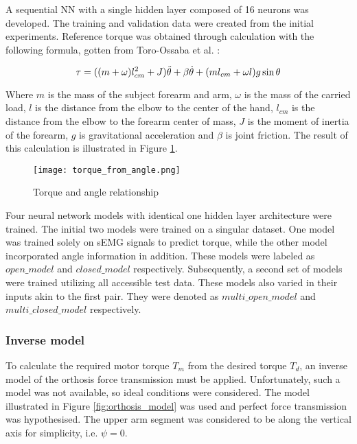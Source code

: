 A sequential NN with a single hidden layer composed of 16 neurons was developed. 
The training and validation data were created from the initial experiments. 
Reference torque was obtained through calculation with the following formula, 
gotten from Toro-Ossaba et al. \cite{toro-ossaba_myoelectric_2024}: 

\begin{equation}
  \centering
  \tau=((m+\omega)l_{cm}^2+J)\ddot{\theta}+\beta \dot{\theta}+(ml_{cm}+\omega l)g\sin{\theta}
  \label{eq:torque}
\end{equation}

Where $m$ is the mass of the subject forearm and arm, $\omega$ is the mass of 
the carried load, $l$ is the distance from the elbow to the center of the hand,
$l_{cm}$ is the distance from the elbow to the forearm center of mass, $J$ is 
the moment of inertia of the forearm, $g$ is gravitational acceleration and 
$\beta$ is joint friction. The result of this calculation is illustrated in 
Figure \ref{fig:torque_from_angle}.  

\begin{figure}[htbp]
  \centering
  \texttt{[image: torque\_from\_angle.png]}
  \caption{Torque and angle relationship}
  \label{fig:torque_from_angle}
\end{figure}

Four neural network models with identical one hidden layer architecture were trained. 
The initial two models were trained on a singular dataset. One model was trained 
solely on sEMG signals to predict torque, while the other model incorporated angle 
information in addition. These models were labeled as $open\_model$ and $closed\_model$ 
respectively. Subsequently, a second set of models were trained utilizing all 
accessible test data. These models also varied in their inputs akin to the first 
pair. They were denoted as $multi\_open\_model$ and $multi\_closed\_model$ respectively.
\FloatBarrier

\subsubsection{Inverse model}
To calculate the required motor torque $T_m$ from the desired torque $T_d$, 
an inverse model of the orthosis force transmission must be applied. Unfortunately, 
such a model was not available, so ideal conditions were considered. The model 
illustrated in Figure \ref{fig:orthosis_model} was used and perfect force 
transmission was hypothesised. The upper arm segment was considered to be along the 
vertical axis for simplicity, i.e. $\psi=0$.  

